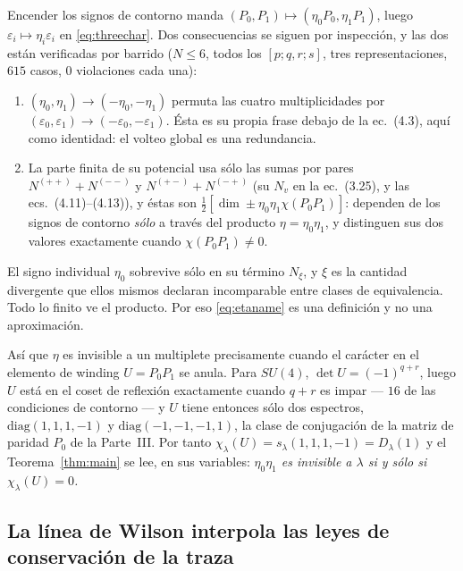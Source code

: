 \documentclass[11pt,a4paper]{article}
\newcommand{\su}[1]{SU(#1)}
\newcommand{\Dl}{D_\lambda}
\begin{document}
Encender los signos de contorno manda $(P_0,P_1)\mapsto(\eta_0P_0,\eta_1P_1)$, luego
$\varepsilon_i\mapsto\eta_i\varepsilon_i$ en \eqref{eq:threechar}. Dos consecuencias se siguen por
inspección, y las dos están verificadas por barrido ($N\le6$, todos los $[p;q,r;s]$, tres
representaciones, $615$ casos, $0$ violaciones cada una):
\begin{enumerate}\itemsep2pt
\item $(\eta_0,\eta_1)\to(-\eta_0,-\eta_1)$ permuta las cuatro multiplicidades por
$(\varepsilon_0,\varepsilon_1)\to(-\varepsilon_0,-\varepsilon_1)$. Ésta es su propia frase debajo de
la ec.~(4.3), aquí como identidad: el volteo global es una redundancia.
\item La parte finita de su potencial usa sólo las sumas por pares $N^{(++)}+N^{(--)}$ y
$N^{(+-)}+N^{(-+)}$ (su $N_v$ en la ec.~(3.25), y las ecs.~(4.11)--(4.13)), y éstas son
$\frac12[\dim\pm\eta_0\eta_1\chi(P_0P_1)]$: dependen de los signos de contorno \emph{sólo} a través
del producto $\eta=\eta_0\eta_1$, y distinguen sus dos valores exactamente cuando
$\chi(P_0P_1)\neq0$.
\end{enumerate}
El signo individual $\eta_0$ sobrevive sólo en su término $N_\xi$, y $\xi$ es la cantidad divergente
que ellos mismos declaran incomparable entre clases de equivalencia. Todo lo finito ve el producto.
Por eso \eqref{eq:etaname} es una definición y no una aproximación.

Así que $\eta$ es invisible a un multiplete precisamente cuando el carácter en el elemento de winding
$U=P_0P_1$ se anula. Para $\su4$, $\det U=(-1)^{q+r}$, luego $U$ está en el coset de reflexión
exactamente cuando $q+r$ es impar --- $16$ de las condiciones de contorno --- y $U$ tiene entonces
sólo dos espectros, $\mathrm{diag}(1,1,1,-1)$ y $\mathrm{diag}(-1,-1,-1,1)$, la clase de conjugación
de la matriz de paridad $P_0$ de la Parte~III. Por tanto $\chi_\lambda(U)=s_\lambda(1,1,1,-1)=\Dl(1)$
y el Teorema~\ref{thm:main} se lee, en sus variables: \emph{$\eta_0\eta_1$ es invisible a $\lambda$ si
y sólo si $\chi_\lambda(U)=0$.}

\subsection{La línea de Wilson interpola las leyes de conservación de la traza}\label{sec:interp}
\end{document}
